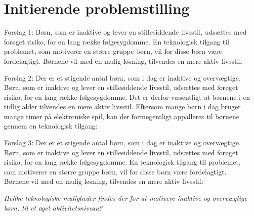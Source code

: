 \section{Initierende problemstilling}
Forslag 1: 
Børn, som er inaktive og lever en stillesiddende livsstil, udsættes med forøget risiko, for en lang række følgesygdomme. En teknologisk tilgang til problemet, som motiverer en større gruppe børn, vil for disse børn være fordelagtigt. Børnene vil med en mulig løsning, tilvendes en mere aktiv livsstil: 

Forslag 2: 
Der er et stigende antal børn, som i dag er inaktive og overvægtige. Børn, som er inaktive og lever en stillesiddende livsstil, udsættes med forøget risiko, for en lang række følgesygdomme. Det er derfor væsentligt at børnene i en tidlig alder tilvendes en mere aktiv livsstil. Eftersom mange børn i dag bruger mange timer på elektroniske spil, kan der formegentligt appalleres til børnene gennem en teknologisk tilgang:

Forslag 3:
Der er et stigende antal børn, som i dag er inaktive og overvægtige. Børn, som er inaktive og lever en stillesiddende livsstil, udsættes med forøget risiko, for en lang række følgesygdomme. En teknologisk tilgang til problemet, som motiverer en større gruppe børn, vil for disse børn være fordelagtigt. Børnene vil med en mulig løsning, tilvendes en mere aktiv livsstil: 


\begin{center}
\textit{Hvilke teknologiske muligheder findes der for at motivere inaktive og overvægtige børn, til et øget aktivitetsniveau?}
\end{center}